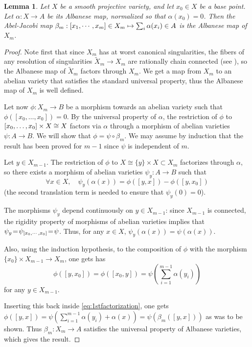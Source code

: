 \documentclass[JEP,XML,SOM,Unicode, NoEqCountersInSection,NoFloatCountersInSection,published]{cedram}
\newcommand\mto{\mathchoice{\longmapsto}{\mapsto}{\mapsto}{\mapsto}}
\let\ts\textstyle
\theoremstyle{theorem}
\newtheorem{lemma}[proposition]{Lemma}
\theoremstyle{definition}
\begin{document}
\begin{lemma}
Let \(X\) be a smooth projective variety, and let \(x_{0} \in X\) be a base point. Let \(\alpha : X \to A\) be its Albanese map, normalized so that \(\alpha(x_{0}) = 0\). Then the Abel-Jacobi map \(\beta_{m} : [x_{1}, \cdots, x_{m}] \in X_{m} \mto \sum_{i} \alpha(x_{i}) \in A\) is the Albanese map of \(X_{m}\).
\end{lemma}
\begin{proof}
Note first that since \(X_{m}\) has at worst canonical singularities, the fibers of any resolution of singularities \(\widetilde{X}_{m} \to X_{m}\) are rationally chain connected (see \cite{HM07}), so the Albanese map of \(\widetilde{X}_{m}\) factors through \(X_{m}\). We get a map from \(X_{m}\) to an abelian variety that satisfies the standard universal property, thus the Albanese map of \(X_{m}\) is well defined.

Let now \(\phi : X_{m} \to B\) be a morphism towards an abelian variety such that \(\phi([x_{0}, \dotsc, x_{0}]) = 0\). By the universal property of \(\alpha\), the restriction of \(\phi\) to \([x_{0}, \dotsc, x_{0}] \times\nobreak X \cong X\) factors via \(\alpha\) through a morphism of abelian varieties \(\psi : A \to B\). We will show that \(\phi = \psi \circ \beta_{m}\). We may assume by induction that the result has been proved for \(m-1\) since \(\psi\) is independent of \(m\).

Let \(y \in X_{m-1}\). The restriction of \(\phi\) to \(X \cong \{y\} \times X \subset X_{m}\) factorizes through \(\alpha\), so there exists a morphism of abelian varieties \(\psi_{y} : A \to B\) such that
\begin{equation} \label{eq:1stfactorization}
\forall x \in X,\quad \psi_{y}(\alpha(x)) = \phi([y, x]) - \phi([y, x_{0}])
\end{equation}
(the second translation term is needed to ensure that \(\psi_{y}(0) = 0\)).

The morphisms \(\psi_{y}\) depend continuously on \(y \in X_{m-1}\): since \(X_{m-1}\) is connected, the rigidity property of morphisms of abelian varieties implies that \(\psi_{y}\!=\!\psi_{[x_{0}, \cdots, x_{0}]}\!=\!\nobreak\psi\). Thus, for any \(x \in X\), \(\psi_{y}(\alpha(x)) = \psi(\alpha(x))\).

Also, using the induction hypothesis, to the composition of \(\phi\) with the morphism \(\{x_{0}\} \times X_{m-1} \to X_{m}\), one gets has
\[
\phi([y, x_{0}]) = \phi([x_{0}, y]) = \ts\psi(\sum_{i = 1}^{m-1} \alpha(y_{i}))
\]
for any \(y \in X_{m-1}\).

Inserting this back inside \eqref{eq:1stfactorization}, one gets \(\phi([y, x]) = \psi(\sum_{i=1}^{m-1}\alpha(y_{i}) + \alpha(x)) = \psi(\beta_{m}([y,x]))\) as was to be shown. Thus \(\beta_{m} : X_{m} \to A\) satisfies the universal property of Albanese varieties, which gives the result.
\end{proof}
\end{document}
